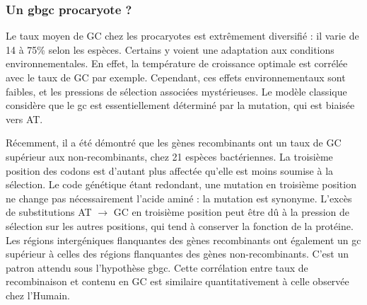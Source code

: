 \documentclass[11pt, oneside]{scrartcl}
\begin{document}

\subsubsection{Un \ac{gbgc} procaryote ?}
\label{sec:orgheadline13}
Le taux moyen de GC chez les procaryotes est extrêmement diversifié : il varie
de 14 à 75\% selon les espèces. Certains y voient une adaptation aux conditions
environnementales. En effet, la température de croissance optimale est corrélée
avec le taux de GC par exemple. Cependant, ces effets environnementaux sont
faibles, et les pressions de sélection associées mystérieuses. Le modèle
classique considère que le \ac{gc} est essentiellement déterminé par la
mutation, qui est biaisée vers
AT\cite{hershberg_evidence_2010,sueoka_directional_1988}.

Récemment, il a été démontré que les gènes recombinants ont un taux de GC
supérieur aux non-recombinants\cite{lassalle_gc-content_2015}, chez 21 espèces
bactériennes. La troisième position des codons est d'autant plus affectée
qu'elle est moins soumise à la sélection. Le code génétique étant redondant, une
mutation en troisième position ne change pas nécessairement l'acide aminé : la
mutation est synonyme. L'excès de substitutions AT \(\rightarrow\) GC en troisième
position peut être dû à la pression de sélection sur les autres positions, qui
tend à conserver la fonction de la protéine. Les régions intergéniques
flanquantes des gènes recombinants ont également un \ac{gc} supérieur à celles
des régions flanquantes des gènes non-recombinants. C'est un patron attendu sous
l'hypothèse \ac{gbgc}. Cette corrélation entre taux de recombinaison et contenu
en GC est similaire quantitativement à celle observée chez
l'Humain\cite{lassalle_gc-content_2015}.
\end{document}
